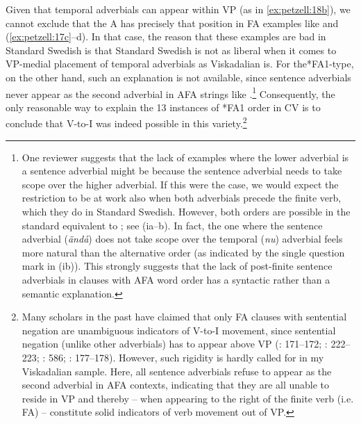 \documentclass[output=paper,colorlinks,citecolor=brown,draft,draftmode]{langscibook}
\begin{document}
Given that temporal adverbials can appear within VP (as in \ref{ex:petzell:18b}), we cannot exclude that the A has precisely that position in FA examples like  and (\ref{ex:petzell:17c}–d). In that case, the reason that these examples are bad in Standard Swedish is that Standard Swedish is not as liberal when it comes to VP-medial placement of temporal adverbials as Viskadalian is. For the*FA1-type, on the other hand, such an explanation is not available, since sentence adverbials never appear as the second adverbial in AFA strings like .\footnote{One
    reviewer suggests that the lack of examples where the lower adverbial is a sentence adverbial might be because the sentence adverbial needs to take scope over the higher adverbial. If this were the case, we would expect the restriction to be at work also when both adverbials precede the finite verb, which they do in Standard Swedish. However, both orders are possible in the standard equivalent to ; see (ia–b). In fact, the one where the sentence adverbial (\textit{ändå}) does not take scope over the temporal (\textit{nu}) adverbial feels more natural than the alternative order (as indicated by the single question mark in (ib)). This strongly suggests that the lack of post-finite sentence adverbials in clauses with AFA word order has a syntactic rather than a semantic explanation.
    \ea
    \z
    \z
}
Consequently, the only reasonable way to explain the 13 instances of *FA1 order in CV is to conclude that V-to-I was indeed possible in this variety.\footnote{Many scholars in the past have claimed that only FA clauses with sentential negation are unambiguous indicators of V-to-I movement, since sentential negation (unlike other adverbials) has to appear above VP (\citealt{Falk1993}: 171–172; \citealt{WiklundEtAl2007}: 222–223; \citealt{KoenemanZeijlstra2014}: 586; \citealt{HeycockSundquist2017}: 177–178). However, such rigidity is hardly called for in my Viskadalian sample. Here, all sentence adverbials refuse to appear as the second adverbial in AFA contexts, indicating that they are all unable to reside in VP and thereby – when appearing to the right of the finite verb (i.e. FA) – constitute solid indicators of verb movement out of VP.}
\end{document}
